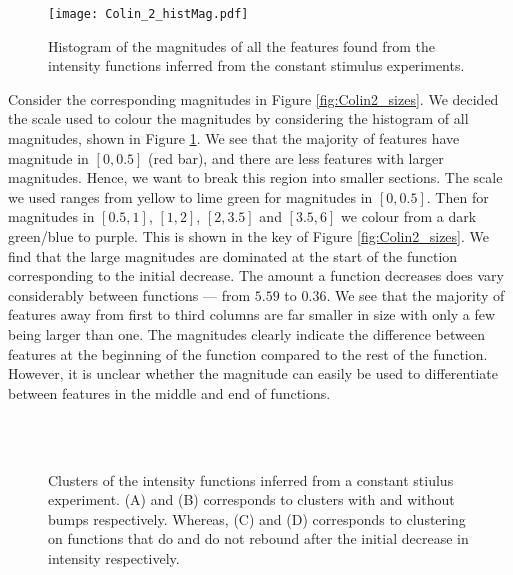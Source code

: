 \documentclass[../main.tex]{subfiles}
\begin{document}
  \begin{figure}[b!]
   \hrulefill
   \begin{center} 
    {\texttt{[image: Colin\_2\_histMag.pdf]} }
    \end{center}     
    \caption{Histogram of the magnitudes of all the features found from the intensity functions inferred from the constant stimulus experiments.}
    \label{fig:Colin2_hist}
    \hrulefill
    \end{figure}
    
Consider the corresponding magnitudes in Figure \ref{fig:Colin2_sizes}. We decided the scale used to colour the magnitudes by considering the histogram of all magnitudes, shown in Figure \ref{fig:Colin2_hist}. We see that the majority of features have magnitude in $[0,0.5]$ (red bar), and there are less features with larger magnitudes. Hence, we want to break this region into smaller sections. The scale we used ranges from yellow to lime green for magnitudes in $[0,0.5]$. Then for magnitudes in $[0.5,1]$, $[1,2]$, $[2,3.5]$ and $[3.5,6]$ we colour from a dark green/blue to purple. This is shown in the key of Figure \ref{fig:Colin2_sizes}. We find that the large magnitudes are dominated at the start of the function corresponding to the initial decrease. The amount a function decreases does vary considerably between functions --- from $5.59$ to $0.36$. We see that the majority of features away from first to third columns are far smaller in size with only a few being larger than one. The magnitudes clearly indicate the difference between features at the beginning of the function compared to the rest of the function. However, it is unclear whether the magnitude can easily be used to differentiate between features in the middle and end of functions.


 \begin{figure}[b!]
   \hrulefill
   \begin{center} 
     \quad
      \\ 
      
          \quad
      \\
    \end{center}     
    \caption{Clusters of the intensity functions inferred from a constant stiulus experiment. (A) and (B) corresponds to clusters with and without bumps respectively. Whereas, (C) and (D) corresponds to clustering on functions that do and do not rebound after the initial decrease in intensity respectively. }
    \label{fig:Colin2_Clus}
    \hrulefill
    \end{figure}
    
\end{document}
